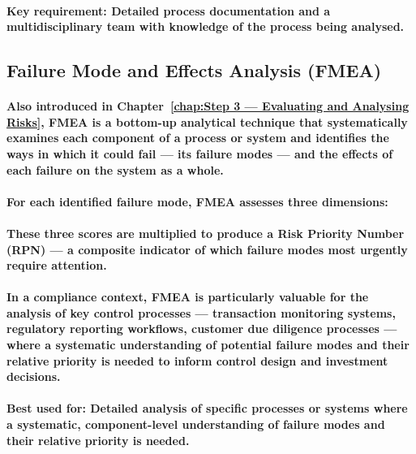 \paragraph{Key requirement: Detailed process documentation and a multidisciplinary team with knowledge of the process being analysed.}

\subsection{Failure Mode and Effects Analysis (FMEA)}
\paragraph{Also introduced in Chapter~\ref{chap:Step 3 — Evaluating and Analysing Risks}, \textbf{FMEA} is a bottom-up analytical technique that systematically examines each component of a process or system and identifies the ways in which it could fail — its \textbf{failure modes} — and the effects of each failure on the system as a whole.}
\paragraph{For each identified failure mode, FMEA assesses three dimensions:}
\begin{itemize}
\end{itemize}
\paragraph{These three scores are multiplied to produce a \textbf{Risk Priority Number (RPN)} — a composite indicator of which failure modes most urgently require attention.}
\paragraph{In a compliance context, FMEA is particularly valuable for the analysis of key control processes — transaction monitoring systems, regulatory reporting workflows, customer due diligence processes — where a systematic understanding of potential failure modes and their relative priority is needed to inform control design and investment decisions.}
\paragraph{\textbf{Best used for}: Detailed analysis of specific processes or systems where a systematic, component-level understanding of failure modes and their relative priority is needed.}
